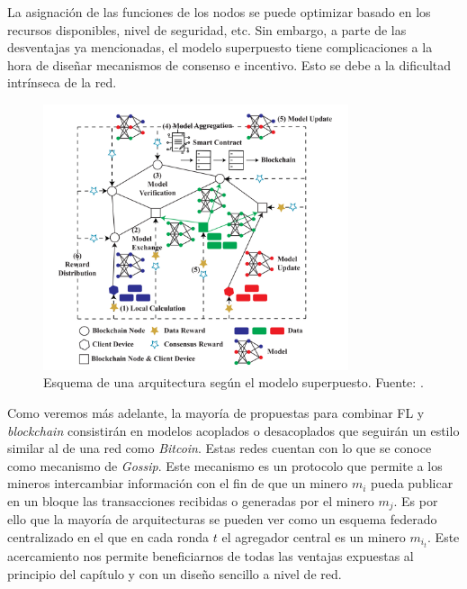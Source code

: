 La asignación de las funciones de los nodos se puede optimizar basado en los recursos disponibles, nivel de seguridad, etc. Sin embargo, a parte de las desventajas ya mencionadas, el modelo superpuesto tiene complicaciones a la hora de diseñar mecanismos de consenso e incentivo. Esto se debe a la dificultad intrínseca de la red.
\begin{figure}[h]
	\centering
	\includegraphics[width=0.8\textwidth]{figuras/overlapped.png}
	\caption{Esquema de una arquitectura según el modelo superpuesto. Fuente: \cite{zhu-2023-blockfed}.}
	\label{fig:overlapped}
\end{figure}

Como veremos más adelante, la mayoría de propuestas para combinar \ac{FL} y \textit{blockchain} consistirán en modelos acoplados o desacoplados que seguirán un estilo similar al de una red como \textit{Bitcoin}. Estas redes cuentan con lo que se conoce como mecanismo de \textit{Gossip}. Este mecanismo es un protocolo que permite a los mineros intercambiar información con el fin de que un minero $m_i$ pueda publicar en un bloque las transacciones recibidas o generadas por el minero $m_j$. Es por ello que la mayoría de arquitecturas se pueden ver como un esquema federado centralizado en el que en cada ronda $t$ el agregador central es un minero $m_{i_t}$. Este acercamiento nos permite beneficiarnos de todas las ventajas expuestas al principio del capítulo y con un diseño sencillo a nivel de red.